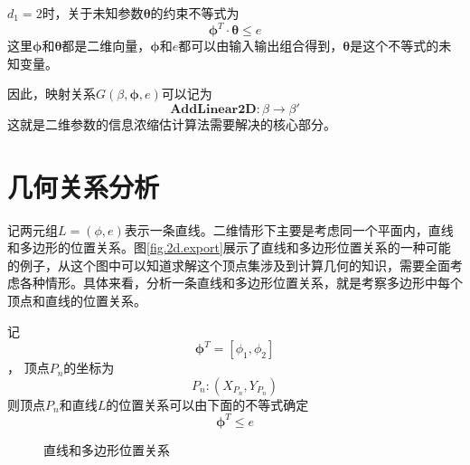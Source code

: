 $d_{1}=2$时，关于未知参数$\bm{\theta}$的约束不等式为
\begin{equation}\label{eq.3.L}
\bm{\phi}^{T}\cdot\bm{\theta}\leq e
\end{equation}
这里$\bm{\phi}$和$\bm{\theta}$都是二维向量，$\bm{\phi}$和$e$都可以由输入输出组合得到，$\bm{\theta}$是这个不等式的未知变量。

因此，映射关系$G(\beta,\bm{\phi},e)$可以记为
\begin{equation}%
\mathbf{AddLinear2D}\colon \beta\rightarrow\beta'
\end{equation}
这就是二维参数的信息浓缩估计算法需要解决的核心部分。

\section{几何关系分析}\label{sect:3.2}
记两元组$L=(\phi,e)$表示一条直线。二维情形下主要是考虑同一个平面内，直线和多边形的位置关系。图\ref{fig.2d.export}展示了直线和多边形位置关系的一种可能的例子，从这个图中可以知道求解这个顶点集涉及到计算几何的知识，需要全面考虑各种情形。具体来看，分析一条直线和多边形位置关系，就是考察多边形中每个顶点和直线的位置关系。

记
$$\bm{\phi}^{T}=[\phi_{1},\phi_{2}]$$，
顶点$P_{n}$的坐标为
\begin{equation*}
P_{n}\colon (X_{P_{n}},Y_{P_{n}})
\end{equation*}
则顶点$P_{n}$和直线$L$的位置关系可以由下面的不等式确定
\begin{equation}\label{eq.3.L.P}
\bm{\phi}^{T}\leq e
\end{equation}

\begin{figure}
	\centering
	\caption{直线和多边形位置关系}	 %
	\label{fig.poly.l}	 %
\end{figure}

